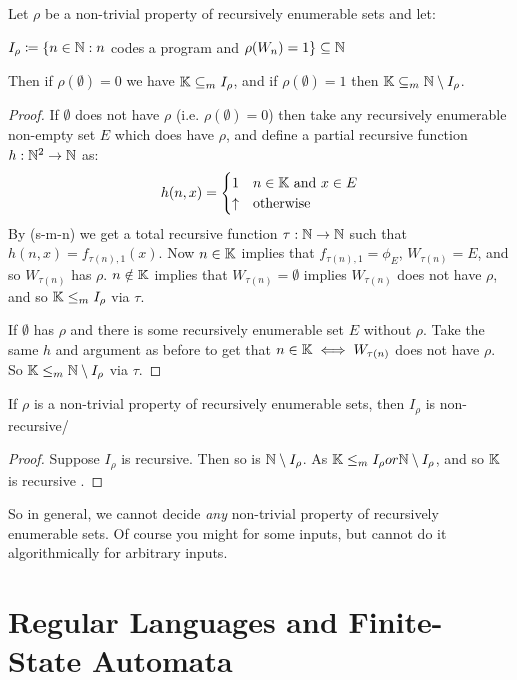 \documentclass[10pt,a4paper]{article}
\begin{document}
\begin{theorem}
Let $\rho$ be a non-trivial property of recursively enumerable sets and let:
\begin{center}
$I_\rho \coloneqq \{n\in\mathbb{N} : n$ codes a program and $\rho(W_n) = 1\} \subseteq \mathbb{N}$
\end{center}
Then if $\rho(\emptyset) = 0$ we have $\mathbb{K} \subseteq_m I_\rho$, and if $\rho(\emptyset) = 1$ then $\mathbb{K} \subseteq_m \mathbb{N}\setminus I_\rho$.
\end{theorem}
\begin{proof}
If $\emptyset$ does not have $\rho$ (i.e. $\rho(\emptyset) = 0$) then take any recursively enumerable non-empty set $E$ which does have $\rho$, and define a partial recursive function $h:\mathbb{N}^2 \to \mathbb{N}$ as:
\begin{align*}
h(n,x) = \begin{cases} 1 & n\in \mathbb{K} \text{ and } x \in E \\ \uparrow & \text{otherwise} \end{cases}
\end{align*}
By (s-m-n) we get a total recursive function $\tau:\mathbb{N} \to \mathbb{N}$ such that $h(n,x) = f_{\tau(n),1}(x)$. Now $n\in\mathbb{K}$ implies that $f_{\tau(n),1} = \phi_E$, $W_{\tau(n)} = E$, and so $W_{\tau(n)}$ has $\rho$. $n\notin \mathbb{K}$ implies that $W_{\tau(n)} = \emptyset$ implies $W_{\tau(n)}$ does not have $\rho$, and so $\mathbb{K} \leq_m I_{\rho}$ via $\tau$.

If $\emptyset$ has $\rho$ and there is some recursively enumerable set $E$ without $\rho$. Take the same $h$ and argument as before to  get that $n \in \mathbb{K} \iff W_{\tau(n)}$ does not have $\rho$. So $\mathbb{K}\leq_m \mathbb{N} \setminus I_{\rho}$ via $\tau$.
\end{proof}
\begin{corollary}
If $\rho$ is a non-trivial property of recursively enumerable sets, then $I_\rho$ is non-recursive/
\end{corollary}
\begin{proof}
Suppose $I_\rho$ is recursive. Then so is $\mathbb{N} \setminus I_\rho$. As $\mathbb{K} \leq_m I_\rho or \mathbb{N}\setminus I_\rho$, and so $\mathbb{K}$ is recursive \contr.
\end{proof}
So in general, we cannot decide \textit{any} non-trivial property of recursively enumerable sets. Of course you might for some inputs, but cannot do it algorithmically for arbitrary inputs.


\section{Regular Languages and Finite-State Automata}
\end{document}
